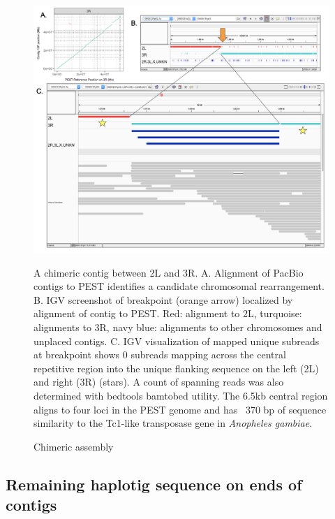 \begin{figure}[htbp!]
\caption{Chimeric assembly}
\label{figure:misassembly}
\begin{centering}
\includegraphics[width=1.0\textwidth]{misassembly.png}
\par{A chimeric contig between 2L and 3R. A. Alignment of PacBio contigs to PEST identifies a candidate chromosomal rearrangement. B. IGV screenshot of breakpoint (orange arrow) localized by alignment of contig to PEST. Red: alignment to 2L, turquoise: alignments to 3R, navy blue: alignments to other chromosomes and unplaced contigs. C. IGV visualization of mapped unique subreads at breakpoint shows 0 subreads mapping across the central repetitive region into the unique flanking sequence on the left (2L) and right (3R) (stars). A count of spanning reads was also determined with bedtools bamtobed utility. The 6.5kb central region aligns to four loci in the PEST genome and has ~370 bp of sequence similarity to the Tc1-like transposase gene in \textit{Anopheles gambiae}.}
\end{centering}
\end{figure}

\subsection{Remaining haplotig sequence on ends of contigs}

